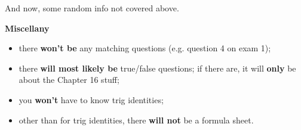 \documentclass[12pt]{article}
\begin{document}
	\noindent And now, some random info not covered above.
	
	\begin{adjustwidth}{0.25in}{0.25in}
		\noindent\textbf{Miscellany}
		\begin{itemize}[topsep=1.5mm,parsep=-4.5mm,itemsep=6mm]
			\item there \textbf{won't be} any matching questions (e.g. question 4 on exam 1);
			\item there \textbf{will most likely be} true/false questions; if there are, it will \textbf{only} be about the Chapter 16 stuff;
			\item you \textbf{won't} have to know trig identities;
			\item other than for trig identities, there \textbf{will not} be a formula sheet.
		\end{itemize}
	\end{adjustwidth}
\end{document}
